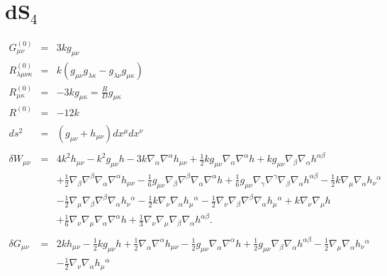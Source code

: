 \documentclass[10pt,letterpaper]{article}
\numberwithin{equation}{section}
\begin{document}
\section{dS${}_4$}
\begin{eqnarray}
G^{(0)}_{\mu\nu} &=& 3kg_{\mu\nu}
\nonumber\\
R^{(0)}_{\lambda\mu\nu\kappa} &=& k(g_{\mu\nu}g_{\lambda\kappa}-g_{\lambda\nu}g_{\mu\kappa})
\nonumber\\
R^{(0)}_{\mu\kappa} &=& -3k g_{\mu\kappa} = \frac{R}{D}g_{\mu\kappa}
\nonumber\\
R^{(0)}&=& -12 k
\nonumber\\ \nonumber\\
ds^2 &=& (g_{\mu\nu} + h_{\mu\nu})dx^\mu dx^\nu
\nonumber\\ \nonumber\\
\delta W_{\mu\nu}&=&4 k^2 h_{\mu \nu}
-  k^2 g_{\mu \nu} h
- 3 k \nabla_{\alpha}\nabla^{\alpha}h_{\mu \nu}
+ \tfrac{1}{2} k g_{\mu \nu} \nabla_{\alpha}\nabla^{\alpha}h
+ k g_{\mu \nu} \nabla_{\beta}\nabla_{\alpha}h^{\alpha \beta}\nonumber\\
&& + \tfrac{1}{2} \nabla_{\beta}\nabla^{\beta}\nabla_{\alpha}\nabla^{\alpha}h_{\mu \nu}
-  \tfrac{1}{6} g_{\mu \nu} \nabla_{\beta}\nabla^{\beta}\nabla_{\alpha}\nabla^{\alpha}h
+ \tfrac{1}{6} g_{\mu \nu} \nabla_{\gamma}\nabla^{\gamma}\nabla_{\beta}\nabla_{\alpha}h^{\alpha \beta}
-  \tfrac{1}{2} k \nabla_{\mu}\nabla_{\alpha}h_{\nu}{}^{\alpha}\nonumber\\
&& -  \tfrac{1}{2} \nabla_{\mu}\nabla_{\beta}\nabla^{\beta}\nabla_{\alpha}h_{\nu}{}^{\alpha}
-  \tfrac{1}{2} k \nabla_{\nu}\nabla_{\alpha}h_{\mu}{}^{\alpha}
-  \tfrac{1}{2} \nabla_{\nu}\nabla_{\beta}\nabla^{\beta}\nabla_{\alpha}h_{\mu}{}^{\alpha}
+ k \nabla_{\nu}\nabla_{\mu}h\nonumber\\
&& + \tfrac{1}{6} \nabla_{\nu}\nabla_{\mu}\nabla_{\alpha}\nabla^{\alpha}h
+ \tfrac{1}{3} \nabla_{\nu}\nabla_{\mu}\nabla_{\beta}\nabla_{\alpha}h^{\alpha \beta}.
\nonumber\\ \nonumber\\
\delta G_{\mu\nu}&=& 2 k h_{\mu \nu}
-  \tfrac{1}{2} k g_{\mu \nu} h
+ \tfrac{1}{2} \nabla_{\alpha}\nabla^{\alpha}h_{\mu \nu}
-  \tfrac{1}{2} g_{\mu \nu} \nabla_{\alpha}\nabla^{\alpha}h
+ \tfrac{1}{2} g_{\mu \nu} \nabla_{\beta}\nabla_{\alpha}h^{\alpha \beta}
-  \tfrac{1}{2} \nabla_{\mu}\nabla_{\alpha}h_{\nu}{}^{\alpha}\nonumber\\
&& -  \tfrac{1}{2} \nabla_{\nu}\nabla_{\alpha}h_{\mu}{}^{\alpha}

\end{eqnarray}
\end{document}
